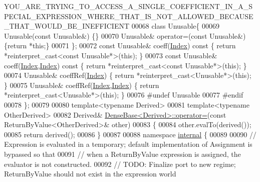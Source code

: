 \begin{DoxyCode}
{       YOU\_ARE\_TRYING\_TO\_ACCESS\_A\_SINGLE\_COEFFICIENT\_IN\_A\_SPECIAL\_EXPRESSION\_WHERE\_THAT\_IS\_NOT\_ALLOWED\_BECAUSE\_THAT\_WOULD\_BE\_INEFFICIENT}
00068     \textcolor{keyword}{class }Unusable\{
00069       Unusable(\textcolor{keyword}{const} Unusable&) \{\}
00070       Unusable& operator=(\textcolor{keyword}{const} Unusable&) \{\textcolor{keywordflow}{return} *\textcolor{keyword}{this};\}
00071     \};
00072     \textcolor{keyword}{const} Unusable& coeff(\hyperlink{namespace_eigen_a62e77e0933482dafde8fe197d9a2cfde}{Index})\textcolor{keyword}{ const }\{ \textcolor{keywordflow}{return} *\textcolor{keyword}{reinterpret\_cast<}\textcolor{keyword}{const }Unusable*\textcolor{keyword}{>}(\textcolor{keyword}{this}); \}
00073     \textcolor{keyword}{const} Unusable& coeff(\hyperlink{namespace_eigen_a62e77e0933482dafde8fe197d9a2cfde}{Index},\hyperlink{namespace_eigen_a62e77e0933482dafde8fe197d9a2cfde}{Index})\textcolor{keyword}{ const }\{ \textcolor{keywordflow}{return} *\textcolor{keyword}{reinterpret\_cast<}\textcolor{keyword}{const }Unusable*\textcolor{keyword}{>}(\textcolor{keyword}{this}); \}
00074     Unusable& coeffRef(\hyperlink{namespace_eigen_a62e77e0933482dafde8fe197d9a2cfde}{Index}) \{ \textcolor{keywordflow}{return} *\textcolor{keyword}{reinterpret\_cast<}Unusable*\textcolor{keyword}{>}(\textcolor{keyword}{this}); \}
00075     Unusable& coeffRef(\hyperlink{namespace_eigen_a62e77e0933482dafde8fe197d9a2cfde}{Index},\hyperlink{namespace_eigen_a62e77e0933482dafde8fe197d9a2cfde}{Index}) \{ \textcolor{keywordflow}{return} *\textcolor{keyword}{reinterpret\_cast<}Unusable*\textcolor{keyword}{>}(\textcolor{keyword}{this}); \}
00076 \textcolor{preprocessor}{#undef Unusable}
00077 \textcolor{preprocessor}{#endif}
00078 \};
00079 
00080 \textcolor{keyword}{template}<\textcolor{keyword}{typename} Derived>
00081 \textcolor{keyword}{template}<\textcolor{keyword}{typename} OtherDerived>
00082 Derived& \hyperlink{group___core___module_a581a7a353bd007b5352f11688e3bc5fa}{DenseBase<Derived>::operator=}(\textcolor{keyword}{const} ReturnByValue<OtherDerived>& 
      other)
00083 \{
00084   other.evalTo(derived());
00085   \textcolor{keywordflow}{return} derived();
00086 \}
00087 
00088 \textcolor{keyword}{namespace }\hyperlink{namespaceinternal}{internal} \{
00089 
00090 \textcolor{comment}{// Expression is evaluated in a temporary; default implementation of Assignment is bypassed so that}
00091 \textcolor{comment}{// when a ReturnByValue expression is assigned, the evaluator is not constructed.}
00092 \textcolor{comment}{// TODO: Finalize port to new regime; ReturnByValue should not exist in the expression world}

\end{DoxyCode}
